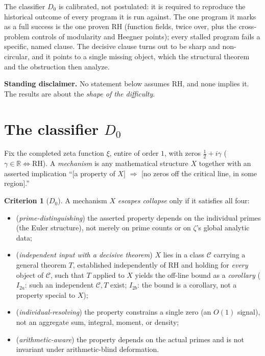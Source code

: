 \documentclass[11pt]{amsart}
\theoremstyle{definition}
\newtheorem{criterion}[theorem]{Criterion}
\theoremstyle{remark}
\newcommand{\bbR}{\mathbb{R}}
\newcommand{\RH}{\mathrm{RH}}
\begin{document}
The classifier $D_0$ is calibrated, not postulated: it is required to
reproduce the historical outcome of every program it is run against. The one
program it marks as a full success is the one proven RH (function fields,
twice over, plus the cross-problem controls of modularity and Heegner points);
every stalled program fails a specific, named clause. The decisive clause turns
out to be sharp and non-circular, and it points to a single missing object,
which the structural theorem and the obstruction then analyze.

\smallskip
\noindent\textbf{Standing disclaimer.} No statement below assumes RH, and none
implies it. The results are about the \emph{shape of the difficulty}.

\section{The classifier \texorpdfstring{$D_0$}{D0}}\label{sec:disc}

Fix the completed zeta function $\xi$, entire of order $1$, with zeros
$\tfrac12+i\gamma$ ($\gamma\in\bbR \iff \RH$). A \emph{mechanism} is any
mathematical structure $X$ together with an asserted implication
``[a property of $X$] $\Rightarrow$ [no zeros off the critical line, in some
region].''

\begin{criterion}[$D_0$]\label{crit:d0}
A mechanism $X$ \emph{escapes collapse} only if it satisfies all four:
\begin{itemize}
\item[$I_1$] (\emph{prime-distinguishing}) the asserted property depends on the
individual primes (the Euler structure), not merely on prime counts or on
$\zeta$'s global analytic data;
\item[$I_2$] (\emph{independent input with a decisive theorem}) $X$ lies in a
class $\mathcal C$ carrying a general theorem $T$, established independently of
RH and holding for \emph{every} object of $\mathcal C$, such that $T$ applied
to $X$ yields the off-line bound as a \emph{corollary} ($I_{2a}$: such an
independent $\mathcal C,T$ exist; $I_{2b}$: the bound is a corollary, not a
property special to $X$);
\item[$I_3$] (\emph{individual-resolving}) the property constrains a single
zero (an $O(1)$ signal), not an aggregate sum, integral, moment, or density;
\item[$I_4$] (\emph{arithmetic-aware}) the property depends on the actual
primes and is not invariant under arithmetic-blind deformation.
\end{itemize}
\end{criterion}
\end{document}
